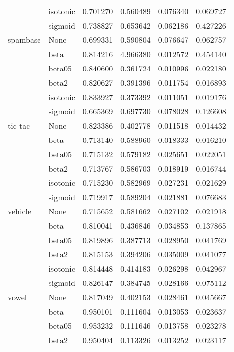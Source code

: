 \begin{tabular}{llrrrr}
        & isotonic &  0.701270 &   0.560489 &  0.076340 &  0.069727 \\
        & sigmoid &  0.738827 &   0.653642 &  0.062186 &  0.427226 \\
spambase & None &  0.699331 &   0.590804 &  0.076647 &  0.062757 \\
        & beta &  0.814216 &   4.966380 &  0.012572 &  0.454140 \\
        & beta05 &  0.840600 &   0.361724 &  0.010996 &  0.022180 \\
        & beta2 &  0.820627 &   0.391396 &  0.011754 &  0.016893 \\
        & isotonic &  0.833927 &   0.373392 &  0.011051 &  0.019176 \\
        & sigmoid &  0.665369 &   0.697730 &  0.078028 &  0.126608 \\
tic-tac & None &  0.823386 &   0.402778 &  0.011518 &  0.014432 \\
        & beta &  0.713140 &   0.588960 &  0.018333 &  0.016210 \\
        & beta05 &  0.715132 &   0.579182 &  0.025651 &  0.022051 \\
        & beta2 &  0.713767 &   0.586703 &  0.018919 &  0.016744 \\
        & isotonic &  0.715230 &   0.582969 &  0.027231 &  0.021629 \\
        & sigmoid &  0.719917 &   0.589204 &  0.021881 &  0.076683 \\
vehicle & None &  0.715652 &   0.581662 &  0.027102 &  0.021918 \\
        & beta &  0.810041 &   0.436846 &  0.034853 &  0.137865 \\
        & beta05 &  0.819896 &   0.387713 &  0.028950 &  0.041769 \\
        & beta2 &  0.815153 &   0.394206 &  0.035009 &  0.041077 \\
        & isotonic &  0.814448 &   0.414183 &  0.026298 &  0.042967 \\
        & sigmoid &  0.826147 &   0.384745 &  0.028166 &  0.075112 \\
vowel & None &  0.817049 &   0.402153 &  0.028461 &  0.045667 \\
        & beta &  0.950101 &   0.111604 &  0.013053 &  0.023637 \\
        & beta05 &  0.953232 &   0.111646 &  0.013758 &  0.023278 \\
        & beta2 &  0.950404 &   0.113326 &  0.013252 &  0.023117 \\

\end{tabular}
